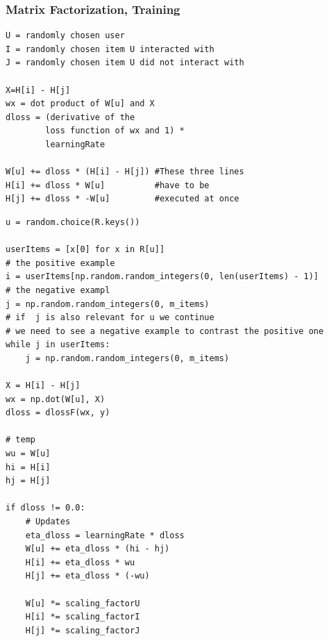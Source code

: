\documentclass[mathserif,svgnames]{beamer}
\newcommand\marktopleft[1]{%
    \tikz[overlay,remember picture] 
    \node (marker-#1-a) at (0,1.5ex) {};%
}
\newcommand\markbottomright[2][red]{%
    \tikz[overlay,remember picture] 
    \node (marker-#2-b) at (0,0) {};%
    \tikz[overlay,remember picture,thick,inner sep=3pt,fill=red]
    \node[draw,rectangle,fill=#1,nearly transparent,fit=(marker-#2-a.center) (marker-#2-b.center)] {};%
}
\begin{document}
\begin{frame}[fragile]
    \frametitle{Matrix Factorization, Training}
\begin{lstlisting}[style=pseudocode]
U = randomly chosen user
I = randomly chosen item U interacted with
J = randomly chosen item U did not interact with

X=H[i] - H[j]
wx = dot product of W[u] and X
dloss = (derivative of the 
        loss function of wx and 1) * 
        learningRate
        
W[u] += dloss * (H[i] - H[j]) #These three lines
H[i] += dloss * W[u]          #have to be
H[j] += dloss * -W[u]         #executed at once
\end{lstlisting}
\end{frame}

\begin{frame}[fragile]
\beamertemplatenavigationsymbolsempty
\begin{lstlisting}[style=python]
u = random.choice(R.keys())

userItems = [x[0] for x in R[u]]
# the positive example
i = userItems[np.random.random_integers(0, len(userItems) - 1)]
# the negative exampl
j = np.random.random_integers(0, m_items)
# if  j is also relevant for u we continue
# we need to see a negative example to contrast the positive one
while j in userItems:
    j = np.random.random_integers(0, m_items)

X = H[i] - H[j]
wx = np.dot(W[u], X)
dloss = dlossF(wx, y)

# temp
wu = W[u]
hi = H[i]
hj = H[j]

if dloss != 0.0:
    # Updates
    eta_dloss = learningRate * dloss
    W[u] += eta_dloss * (hi - hj)
    H[i] += eta_dloss * wu
    H[j] += eta_dloss * (-wu)

    W[u] *= scaling_factorU
    H[i] *= scaling_factorI
    H[j] *= scaling_factorJ
\end{lstlisting}
\end{frame}
%
\end{document}
